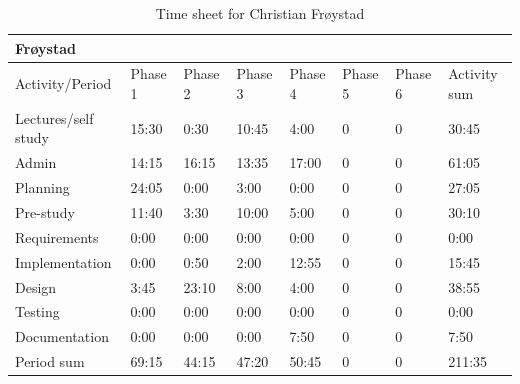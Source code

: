 \documentclass[11pt]{book}
\begin{document}
\begin{table}[H]
\centering
\begin{tabular}{| l | l | l | l | l | l | l | l |}
    \hline
    Frøystad            &          &          &          &          &             &             &                 \\ \hline            
    Activity/Period     & Phase 1  & Phase 2  & Phase  3 & Phase 4  & Phase 5     & Phase 6     & Activity sum    \\ \hline
    Lectures/self study & 15:30    & 0:30     & 10:45    & 4:00     & 0           & 0           & 30:45        \\ \hline
    Admin               & 14:15    & 16:15    & 13:35    & 17:00    & 0           & 0           & 61:05        \\ \hline
    Planning            & 24:05    & 0:00     & 3:00     & 0:00     & 0           & 0           & 27:05        \\ \hline
    Pre-study           & 11:40    & 3:30     & 10:00    & 5:00     & 0           & 0           & 30:10        \\ \hline
    Requirements        & 0:00     & 0:00     & 0:00     & 0:00     & 0           & 0           & 0:00         \\ \hline
    Implementation      & 0:00     & 0:50     & 2:00     & 12:55    & 0           & 0           & 15:45        \\ \hline
    Design              & 3:45     & 23:10    & 8:00     & 4:00     & 0           & 0           & 38:55        \\ \hline
    Testing             & 0:00     & 0:00     & 0:00     & 0:00     & 0           & 0           & 0:00         \\ \hline
    Documentation       & 0:00     & 0:00     & 0:00     & 7:50     & 0           & 0           & 7:50         \\ \hline
    Period sum          & 69:15    & 44:15    & 47:20    & 50:45    & 0           & 0           & 211:35       \\ \hline
\end{tabular}
\caption{Time sheet for Christian Frøystad}
\label{tab:appendix_timesheets_christian}
\end{table}
\end{document}
